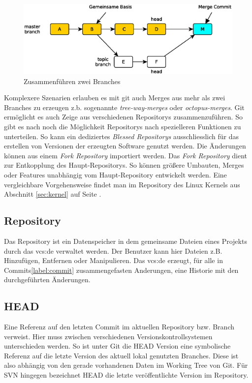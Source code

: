 \begin{figure}[hb]
  \centering
  \includegraphics[scale=0.60]{images/merge.eps}
  \caption{Zusammenführen zwei Branches}
  \label{fig:merge}
\end{figure}

Komplexere Szenarien erlauben es mit git auch Merges aus mehr als zwei Branches
zu erzeugen z.b. sogenannte \textit{tree-way-merges} oder
\textit{octopus-merges}\cite[S.~87]{gitosp}. Git ermöglicht es auch Zeige aus verschiedenen
Repositorys zusammenzuführen. So gibt es nach \cite[3]{gitwf} noch die
Möglichkeit Repositorys nach spezielleren Funktionen zu unterteilen. So kann
ein dediziertes \textit{Blessed Repositorys} ausschliesslich für das erstellen
von Versionen der erzeugten Software genutzt werden. Die Änderungen können aus
einem \textit{Fork Repository} importiert werden. Das \textit{Fork Repository}
dient zur Entkopplung des Haupt-Repositorys. So können größere Umbauten, Merges
oder Features unabhängig vom Haupt-Repository entwickelt
werden\cite[S.~123]{gitwf}. Eine vergleichbare Vorgehensweise findet man im
Repository des Linux Kernels\cite{link:linuxgit} aus Abschnitt \ref{sec:kernel}
auf Seite \pageref{sec:kernel}.

\subsection{Repository}\label{sec:repository}
Das Repository ist ein Datenspeicher in dem gemeinsame Dateien eines Projekts
durch das \acrlong{vcs:de} verwaltet werden. Der Benutzer kann hier Dateien
z.B. Hinzufügen, Entfernen oder Manipulieren. Das  \acrlong{vcs:de} erzeugt,
für alle in Commits\ref{label:commit} zusammengefasten Anderungen, eine
Historie mit den durchgeführten Änderungen\cite[S.~38]{hagen:1678}.

\subsection{HEAD}\label{sec:head}
Eine Referenz auf den letzten Commit im aktuellen Repository bzw. Branch
verweist. Hier muss zwischen verschiedenen Versionskontrollsystemen
unterschieden werden. So ist unter Git die HEAD Version eine symbolische
Referenz auf die letzte Version des aktuell lokal genutzten Branches. Diese ist
also abhängig von den gerade vorhandenen Daten im Working Tree von
Git\cite[S.~20]{gitosp}. Für SVN hingegen bezeichnet HEAD die letzte
veröffentlichte Version im Repository.


